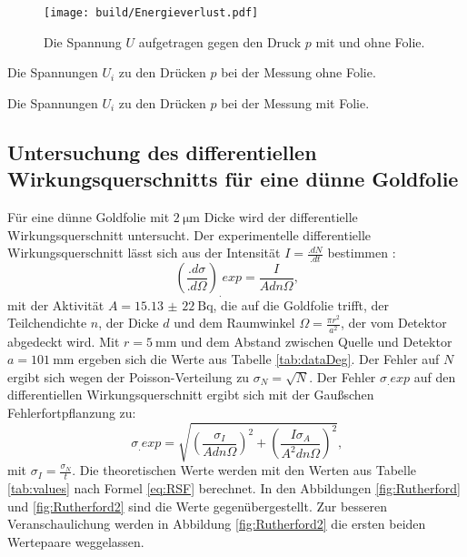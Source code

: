 \begin{figure}
\centering
\texttt{[image: build/Energieverlust.pdf]}
\caption{Die Spannung $U$ aufgetragen gegen den Druck $p$ mit und ohne Folie.}
\label{fig:Foliendicke}
\end{figure}

\begin{table}
	\centering
	\caption{Die Spannungen $U_i$ zu den Drücken $p$ bei der Messung ohne Folie.}
	
	\label{tab:dataOhne}
\end{table}

\begin{table}
	\centering
	\caption{Die Spannungen $U_i$ zu den Drücken $p$ bei der Messung mit Folie.}
	
	\label{tab:dataMit}
\end{table}

\subsection{Untersuchung des differentiellen Wirkungsquerschnitts für eine dünne Goldfolie}

Für eine dünne Goldfolie mit $\SI{2}{\micro\metre}$ Dicke wird der differentielle Wirkungsquerschnitt untersucht.
Der experimentelle differentielle Wirkungsquerschnitt lässt sich aus der Intensität $I=\frac{.dN}{.dt}$ bestimmen \cite{Kroeninger}:
\begin{equation}
\left(\frac{.d\sigma}{.d\Omega}\right)_.{exp} = \frac{I}{Adn\Omega}\text{,}\label{eq:Rutherford}
\end{equation}
mit der Aktivität $A=\SI{15,13(22)}{\becquerel}$, die auf die Goldfolie trifft, der Teilchendichte $n$, der Dicke $d$ und dem Raumwinkel $\Omega=\frac{\pi r^2}{a^2}$, der vom Detektor abgedeckt wird. Mit $r=\SI{5}{\milli\metre}$ und dem Abstand zwischen Quelle und Detektor $a=\SI{101}{\milli\meter}$ \cite{V16} ergeben sich die Werte aus Tabelle \ref{tab:dataDeg}. Der Fehler auf $N$ ergibt sich wegen der Poisson-Verteilung zu $\sigma_N= \sqrt{N}$.
Der Fehler $\sigma_.{exp}$ auf den differentiellen Wirkungsquerschnitt ergibt sich mit der Gaußschen Fehlerfortpflanzung zu:
\begin{equation}
\sigma_.{exp} =\sqrt{\left(\frac{\sigma_I}{Adn\Omega}\right)^2+\left(\frac{I\sigma_A}{A^2dn\Omega}\right)^2} 
\text{,}\label{eq:errorRutherford}
\end{equation}
mit $\sigma_I=\frac{\sigma_N}{t}$.
Die theoretischen Werte werden mit den Werten aus Tabelle \ref{tab:values} nach Formel \eqref{eq:RSF} berechnet. In  den Abbildungen \ref{fig:Rutherford} und \ref{fig:Rutherford2} sind die Werte gegenübergestellt. Zur besseren Veranschaulichung werden in Abbildung \ref{fig:Rutherford2} die ersten beiden Wertepaare weggelassen.\\
 
